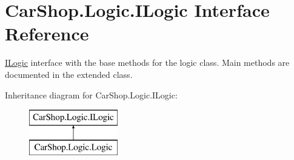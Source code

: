 \hypertarget{interface_car_shop_1_1_logic_1_1_i_logic}{}\section{Car\+Shop.\+Logic.\+I\+Logic Interface Reference}
\label{interface_car_shop_1_1_logic_1_1_i_logic}


\mbox{\hyperlink{interface_car_shop_1_1_logic_1_1_i_logic}{I\+Logic}} interface with the base methods for the logic class. Main methods are documented in the extended class.  


Inheritance diagram for Car\+Shop.\+Logic.\+I\+Logic\+:\begin{figure}[H]
\begin{center}
\leavevmode
\includegraphics[height=2.000000cm]{interface_car_shop_1_1_logic_1_1_i_logic}
\end{center}
\end{figure}
